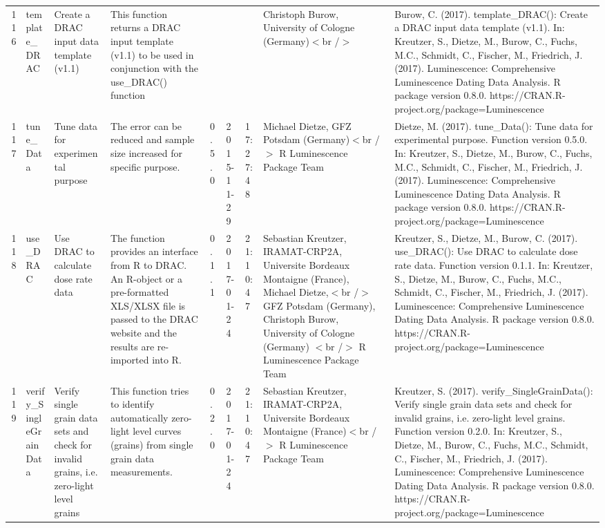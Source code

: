 \begin{table}[ht]
\begin{tabular}{rllllllll}
 \\ 
  116 & template\_DRAC & Create a DRAC input data template (v1.1) & This function returns a DRAC input template (v1.1) to be used in conjunction with the use\_DRAC() function &  &  &  & Christoph Burow, University of Cologne (Germany)$<$br /$>$ & Burow, C. (2017). template\_DRAC(): Create a DRAC input data template (v1.1). In: Kreutzer, S., Dietze, M., Burow, C., Fuchs, M.C., Schmidt, C., Fischer, M., Friedrich, J. (2017). Luminescence: Comprehensive Luminescence Dating Data Analysis. R package version 0.8.0. https://CRAN.R-project.org/package=Luminescence
 \\ 
  117 & tune\_Data & Tune data for experimental purpose & The error can be reduced and sample size increased for specific purpose. & 0.5.0 & 2015-11-29 & 17:27:48
 & Michael Dietze, GFZ Potsdam (Germany)$<$br /$>$  R Luminescence Package Team & Dietze, M. (2017). tune\_Data(): Tune data for experimental purpose. Function version 0.5.0. In: Kreutzer, S., Dietze, M., Burow, C., Fuchs, M.C., Schmidt, C., Fischer, M., Friedrich, J. (2017). Luminescence: Comprehensive Luminescence Dating Data Analysis. R package version 0.8.0. https://CRAN.R-project.org/package=Luminescence
 \\ 
  118 & use\_DRAC & Use DRAC to calculate dose rate data & The function provides an interface from R to DRAC. An R-object or a pre-formatted XLS/XLSX file is passed to the DRAC website and the results are re-imported into R. & 0.1.1 & 2017-01-24 & 21:10:47
 & Sebastian Kreutzer, IRAMAT-CRP2A, Universite Bordeaux Montaigne (France), Michael Dietze,$<$br /$>$ GFZ Potsdam (Germany), Christoph Burow, University of Cologne (Germany) $<$br /$>$  R Luminescence Package Team & Kreutzer, S., Dietze, M., Burow, C. (2017). use\_DRAC(): Use DRAC to calculate dose rate data. Function version 0.1.1. In: Kreutzer, S., Dietze, M., Burow, C., Fuchs, M.C., Schmidt, C., Fischer, M., Friedrich, J. (2017). Luminescence: Comprehensive Luminescence Dating Data Analysis. R package version 0.8.0. https://CRAN.R-project.org/package=Luminescence
 \\ 
  119 & verify\_SingleGrainData & Verify single grain data sets and check for invalid grains, i.e. zero-light level grains & This function tries to identify automatically zero-light level curves (grains) from single grain data measurements. & 0.2.0 & 2017-01-24 & 21:10:47
 & Sebastian Kreutzer, IRAMAT-CRP2A, Universite Bordeaux Montaigne (France)$<$br /$>$  R Luminescence Package Team & Kreutzer, S. (2017). verify\_SingleGrainData(): Verify single grain data sets and check for invalid grains, i.e. zero-light level grains. Function version 0.2.0. In: Kreutzer, S., Dietze, M., Burow, C., Fuchs, M.C., Schmidt, C., Fischer, M., Friedrich, J. (2017). Luminescence: Comprehensive Luminescence Dating Data Analysis. R package version 0.8.0. https://CRAN.R-project.org/package=Luminescence

\end{tabular}
\end{table}
